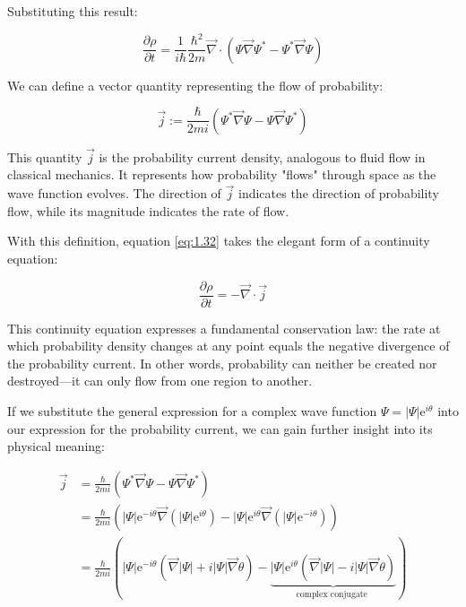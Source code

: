 \documentclass[italian]{HKNdocument}
\begin{document}
Substituting this result:

\begin{equation}
\frac{\partial \rho}{\partial t}=\frac{1}{i\hbar}\frac{\hbar^{2}}{2 m} \vec{\nabla} \cdot\left(\Psi \vec{\nabla} \Psi^{*}-\Psi^{*} \vec{\nabla} \Psi\right) \label{eq:1.32}
\end{equation}

We can define a vector quantity representing the flow of probability:

\begin{equation}
\vec{j}:=\frac{\hbar}{2 m i}\left(\Psi^{*} \vec{\nabla} \Psi-\Psi \vec{\nabla} \Psi^{*}\right) \label{eq:1.33}
\end{equation}

This quantity $\vec{j}$ is the probability current density, analogous to fluid flow in classical mechanics. It represents how probability "flows" through space as the wave function evolves. The direction of $\vec{j}$ indicates the direction of probability flow, while its magnitude indicates the rate of flow.

With this definition, equation \eqref{eq:1.32} takes the elegant form of a continuity equation:

\begin{equation}
\frac{\partial \rho}{\partial t}=-\vec{\nabla} \cdot \vec{j} \label{eq:1.34}
\end{equation}

This continuity equation expresses a fundamental conservation law: the rate at which probability density changes at any point equals the negative divergence of the probability current. In other words, probability can neither be created nor destroyed—it can only flow from one region to another.


If we substitute the general expression for a complex wave function $\Psi=|\Psi| \mathrm{e}^{i \theta}$ into our expression for the probability current, we can gain further insight into its physical meaning:

\begin{align}
\vec{j} &= \frac{\hbar}{2 m i}\left(\Psi^{*} \vec{\nabla} \Psi-\Psi \vec{\nabla} \Psi^{*}\right) \\
&= \frac{\hbar}{2 m i}\left(|\Psi| \mathrm{e}^{-i \theta} \vec{\nabla}\left(|\Psi| \mathrm{e}^{i \theta}\right)-|\Psi| \mathrm{e}^{i \theta} \vec{\nabla}\left(|\Psi| \mathrm{e}^{-i \theta}\right)\right) \\
&= \frac{\hbar}{2 m i}(|\Psi| \mathrm{e}^{-i \theta}(\vec{\nabla}|\Psi|+i|\Psi| \vec{\nabla} \theta)-\underbrace{|\Psi| \mathrm{e}^{i \theta}(\vec{\nabla}|\Psi|-i|\Psi| \vec{\nabla} \theta)}_{\text {complex conjugate }}) \label{eq:1.35} \\
\end{align}
\end{document}

